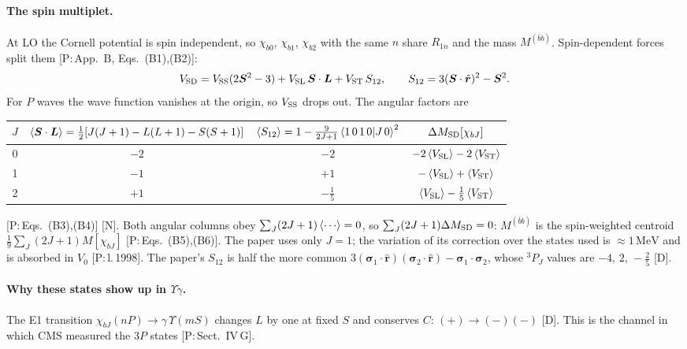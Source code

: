 \documentclass[11pt,a4paper]{article}
\newcommand{\tagP}[1]{\textcolor{blue!65!black}{\textsf{\small[P:\,#1]}}}
\newcommand{\tagD}{\textcolor{orange!85!black}{\textsf{\small[D]}}}
\newcommand{\tagN}{\textcolor{red!70!black}{\textsf{\small[N]}}}
\newcommand{\MeV}{\,\mathrm{MeV}}
\begin{document}
\paragraph{The spin multiplet.} At LO the Cornell potential is spin independent, so $\chi_{b0}$, $\chi_{b1}$, $\chi_{b2}$ with the same $n$ share $R_{1n}$ and the mass $M^{(\bar bb)}$. Spin-dependent forces split them \tagP{App.~B, Eqs.~(B1),(B2)}:
\begin{equation}
V_{\rm SD}=V_{\rm SS}(2\bm S^2-3)+V_{\rm SL}\,\bm S\cdot\bm L+V_{\rm ST}\,S_{12},\qquad S_{12}=3(\bm S\cdot\hat{\bm r})^2-\bm S^2 .
\end{equation}
For $P$ waves the wave function vanishes at the origin, so $V_{\rm SS}$ drops out. The angular factors are
\begin{center}
\small
\begin{tabular}{cccc}
\toprule
$J$ & $\braket{\bm S\cdot\bm L}=\frac12[J(J+1)-L(L+1)-S(S+1)]$ & $\braket{S_{12}}=1-\frac{9}{2J+1}\braket{1\,0\,1\,0|J\,0}^2$ & $\Delta M_{\rm SD}[\chi_{bJ}]$\\
\midrule
0 & $-2$ & $-2$ & $-2\braket{V_{\rm SL}}-2\braket{V_{\rm ST}}$\\
1 & $-1$ & $+1$ & $-\braket{V_{\rm SL}}+\braket{V_{\rm ST}}$\\
2 & $+1$ & $-\frac15$ & $\braket{V_{\rm SL}}-\frac15\braket{V_{\rm ST}}$\\
\bottomrule
\end{tabular}
\end{center}
\tagP{Eqs.~(B3),(B4)} \tagN. Both angular columns obey $\sum_J(2J+1)\braket{\cdots}=0$, so $\sum_J(2J+1)\Delta M_{\rm SD}=0$: $M^{(\bar bb)}$ is the spin-weighted centroid $\frac19\sum_J(2J+1)M[\chi_{bJ}]$ \tagP{Eqs.~(B5),(B6)}. The paper uses only $J=1$; the variation of its correction over the states used is $\approx1\MeV$ and is absorbed in $V_0$ \tagP{l.\,1998}. The paper's $S_{12}$ is half the more common $3(\bm\sigma_1\cdot\hat{\bm r})(\bm\sigma_2\cdot\hat{\bm r})-\bm\sigma_1\cdot\bm\sigma_2$, whose $^3P_J$ values are $-4,\,2,\,-\frac25$ \tagD.

\paragraph{Why these states show up in $\Upsilon\gamma$.} The E1 transition $\chi_{bJ}(nP)\to\gamma\,\Upsilon(mS)$ changes $L$ by one at fixed $S$ and conserves $C$: $(+)\to(-)(-)$ \tagD. This is the channel in which CMS measured the $3P$ states \tagP{Sect.~IV\,G}.
\end{document}
